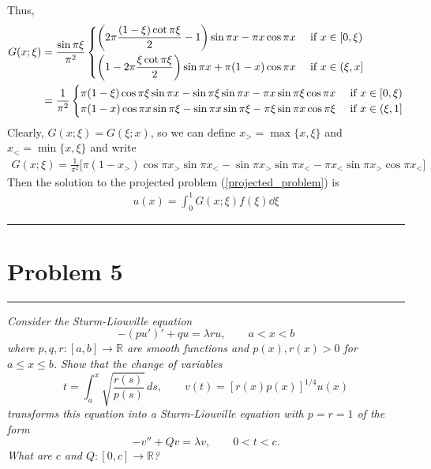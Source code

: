 \documentclass{article} %
\theoremstyle{plain}
\def\Rl{\mathbb{R}}
\newcommand{\problem}[1]{
\vspace{.375cm}
\begin{minipage}{\textwidth}
    \begin{center}
        \noindent\rule{5cm}{1pt}
    \end{center}
    \section{\bf #1}
    \begin{center}
        \noindent\rule{5cm}{1pt}
    \end{center}
    \vspace{0.25cm}
\end{minipage}
}
\begin{document}
Thus,
\begin{align*}
    G(x;\xi) &= \frac{\sin\pi\xi}{\pi^2}\begin{cases}
        \qty(2\pi \dfrac{(1-\xi)\cot\pi\xi}{2} - 1)\sin \pi x - \pi x\cos\pi x & \text{ if } x \in [0,\xi) \\[.3cm]
        \qty(1 - 2\pi \dfrac{\xi\cot\pi\xi}{2})\sin \pi x + \pi(1-x)\cos\pi x & \text{ if } x \in (\xi,x]
    \end{cases} \\
    &= \frac{1}{\pi^2}\begin{cases}
        \pi(1 - \xi)\cos\pi\xi \sin\pi x  - \sin\pi\xi\sin\pi x - \pi x\sin\pi\xi\cos\pi x & \text{ if } x \in [0,\xi)\\
        \pi(1 - x)\cos\pi x \sin\pi \xi  - \sin\pi x\sin\pi \xi - \pi \xi\sin\pi x\cos\pi \xi & \text{ if } x \in (\xi,1]
    \end{cases}
\end{align*}
Clearly, $G(x;\xi) = G(\xi;x)$, so we can define $x_> = \max\{x, \xi\}$ and $x_< = \min\{x,\xi\}$ and write
\begin{align*}
    G(x;\xi) = \frac{1}{\pi^2}\Big[\pi(1 - x_>)\cos\pi x_> \sin\pi x_<  - \sin\pi x_>\sin\pi x_< - \pi x_<\sin\pi x_>\cos\pi x_<\Big]
\end{align*}
Then the solution to the projected problem (\ref{projected_problem}) is
\begin{align*}
    u(x) = \int_0^1 G(x;\xi)f(\xi)\dd \xi
\end{align*}


\problem{Problem 5}
\emph{Consider the Sturm-Liouville equation
\[
-(pu')' + q u = \lambda r u,\qquad a<x<b
\]
where $p, q, r: [a,b] \to \Rl$ are smooth functions and $p(x), r(x) > 0$ for $a\le x\le b$.
Show that the change of variables
\[
t = \int_a^x \sqrt{\frac{r(s)}{p(s)}}\, ds,\qquad v(t) = \left[r(x) p(x)\right]^{1/4} u(x)
\]
transforms this equation into a  Sturm-Liouville equation with $p=r=1$ of the form
\[
-v'' + Q v = \lambda v,\qquad 0<t<c.
\]
What are $c$ and $Q:[0,c]\to \Rl$?
}\\
\end{document}
